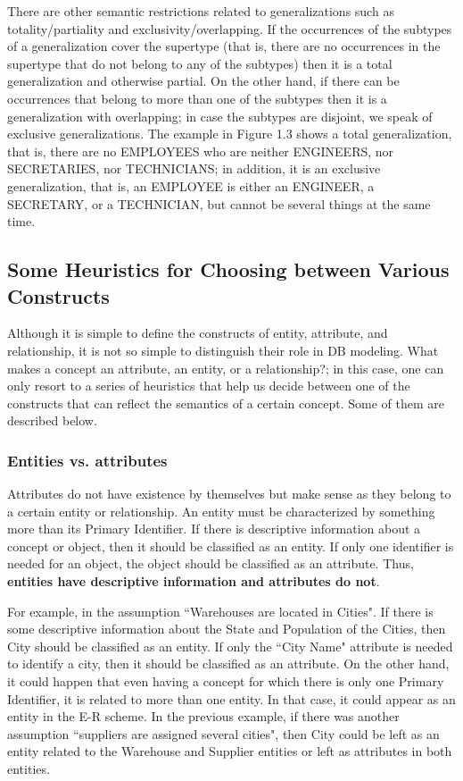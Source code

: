 \documentclass{article}
\numberwithin{figure}{section}
\begin{document}
There are other semantic restrictions related to generalizations such as totality/partiality and exclusivity/overlapping.  If the occurrences of the subtypes of a generalization cover the supertype (that is, there are no occurrences in the supertype that do not belong to any of the subtypes) then it is a total generalization and otherwise partial.  On the other hand, if there can be occurrences that belong to more than one of the subtypes then it is a generalization with overlapping; in case the subtypes are disjoint, we speak of exclusive generalizations.  The example in Figure 1.3 shows a total generalization, that is, there are no EMPLOYEES who are neither ENGINEERS, nor SECRETARIES, nor TECHNICIANS; in addition, it is an exclusive generalization, that is, an EMPLOYEE is either an ENGINEER, a SECRETARY, or a TECHNICIAN, but cannot be several things at the same time.

\subsection{
Some Heuristics for Choosing between Various Constructs
}

Although it is simple to define the constructs of entity, attribute, and relationship, it is not so simple to distinguish their role in DB modeling.  What makes a concept an attribute, an entity, or a relationship?; in this case, one can only resort to a series of heuristics that help us decide between one of the constructs that can reflect the semantics of a certain concept.  Some of them are described below.

\subsubsection{Entities vs. attributes}

Attributes do not have existence by themselves but make sense as they belong to a certain entity or relationship.  An entity must be characterized by something more than its Primary Identifier.  If there is descriptive information about a concept or object, then it should be classified as an entity.  If only one identifier is needed for an object, the object should be classified as an attribute.  Thus, \textbf{entities have descriptive information and attributes do not}.

For example, in the assumption ``Warehouses are located in Cities".  If there is some descriptive information about the State and Population of the Cities, then City should be classified as an entity.  If only the ``City Name" attribute is needed to identify a city, then it should be classified as an attribute.  On the other hand, it could happen that even having a concept for which there is only one Primary Identifier, it is related to more than one entity.  In that case, it could appear as an entity in the E-R scheme.  In the previous example, if there was another assumption ``suppliers are assigned several cities", then City could be left as an entity related to the Warehouse and Supplier entities or left as attributes in both entities.
\end{document}
